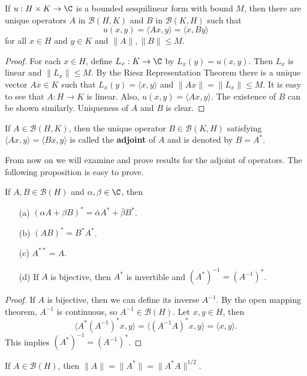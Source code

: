 \begin{theorem}\label{Hilbert space sesquilinear form char}
If $u:H\times K\to\C$ is a bounded sesquilinear form with bound $M$, then there are unique operators $A$ in $\mathcal{B}(H,K)$ and $B$ in $\mathcal{B}(K,H)$ such that
\[u(x,y)=\langle Ax,y\rangle=\langle x,By\rangle\]
for all $x\in H$ and $y\in K$ and $\|A\|,\|B\|\leq M$.
\end{theorem}
\begin{proof}
For each $x\in H$, define $L_x:K\to\C$ by $L_x(y)=u(x,y)$. Then $L_x$ is linear and $\|L_x\|\leq M$. By the Riesz Representation Theorem there is a unique vector $Ax\in K$ such that $L_x(y)=\langle x,y\rangle$ and $\|Ax\|=\|L_x\|\leq M$. It is easy to see that $A:H\to K$ is linear. Also, $u(x,y)=\langle Ax,y\rangle$. The existence of $B$ can be shown similarly. Uniqueness of $A$ and $B$ is clear.
\end{proof}
\begin{definition}
If $A\in\mathcal{B}(H,K)$, then the unique operator $B\in\mathcal{B}(K,H)$ satisfying $\langle Ax,y\rangle=\langle Bx,y\rangle$ is called the \textbf{adjoint} of $A$ and is denoted by $B=A^*$.
\end{definition}
From now on we will examine and prove results for the adjoint of operators. The following proposition is easy to prove.
\begin{proposition}\label{Hilbert space adjoint prop}
If $A,B\in\mathcal{B}(H)$ and $\alpha,\beta\in\C$, then
\begin{itemize}
\item[(a)] $(\alpha A+\beta B)^*=\bar{\alpha}A^*+\bar{\beta}B^*$.
\item[(b)] $(AB)^*=B^*A^*$.
\item[(c)] $A^{**}=A$.
\item[(d)] If $A$ is bijective, then $A^*$ is invertible and $(A^*)^{-1}=(A^{-1})^*$.
\end{itemize}
\end{proposition}
\begin{proof}
If $A$ is bijective, then we can define its inverse $A^{-1}$. By the open mapping theorem, $A^{-1}$ is continuous, so $A^{-1}\in\mathcal{B}(H)$.
Let $x,y\in H$, then
\[\langle A^*(A^{-1})^*x,y\rangle=\langle(A^{-1}A)^*x,y\rangle=\langle x,y\rangle.\]
This implies $(A^*)^{-1}=(A^{-1})^*$.
\end{proof}
\begin{proposition}\label{Hilbert space norm of adjoint}
If $A\in\mathcal{B}(H)$, then $\|A\|=\|A^*\|=\|A^*A\|^{1/2}$.
\end{proposition}
